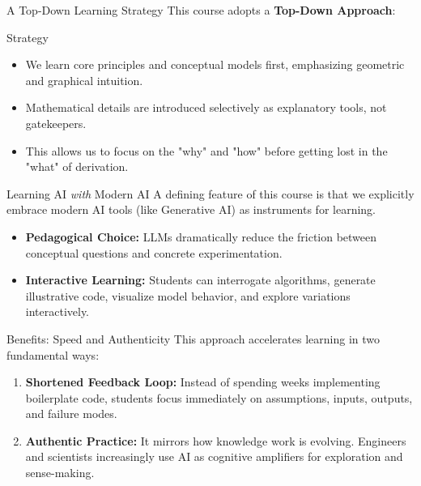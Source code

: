 \documentclass[german,10pt]{beamer}
\begin{document}
\begin{frame}{A Top-Down Learning Strategy}
    \justifying
    This course adopts a \textbf{Top-Down Approach}:
    \begin{conceptbox}{Strategy}
    \begin{itemize}
        \item We learn core principles and conceptual models first, emphasizing geometric and graphical intuition.
        \item Mathematical details are introduced selectively as explanatory tools, not gatekeepers.
        \item This allows us to focus on the "why" and "how" before getting lost in the "what" of derivation.
    \end{itemize}
    \end{conceptbox}
\end{frame}

\begin{frame}{Learning AI \emph{with} Modern AI}
    \justifying
    A defining feature of this course is that we explicitly embrace modern AI tools (like Generative AI) as instruments for learning.
    \begin{itemize}
        \item \textbf{Pedagogical Choice:} LLMs dramatically reduce the friction between conceptual questions and concrete experimentation.
        \item \textbf{Interactive Learning:} Students can interrogate algorithms, generate illustrative code, visualize model behavior, and explore variations interactively.
    \end{itemize}
\end{frame}

\begin{frame}{Benefits: Speed and Authenticity}
    \justifying
    This approach accelerates learning in two fundamental ways:
    \begin{enumerate}
        \item \textbf{Shortened Feedback Loop:} Instead of spending weeks implementing boilerplate code, students focus immediately on assumptions, inputs, outputs, and failure modes.
        \item \textbf{Authentic Practice:} It mirrors how knowledge work is evolving. Engineers and scientists increasingly use AI as cognitive amplifiers for exploration and sense-making.
    \end{enumerate}
\end{frame}
\end{document}
